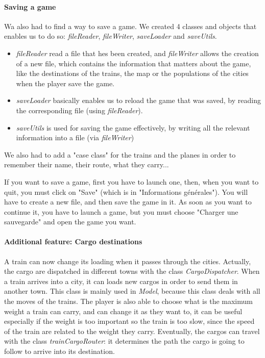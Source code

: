 \documentclass[a4paper]{article}
\begin{document}
	\paragraph{Saving a game} 
	Wa also had to find a way to save a game. We created 4 classes and objects that enables us to do so: \textit{fileReader}, \textit{fileWriter}, \textit{saveLoader} and \textit{saveUtils}.
	\begin{itemize}
		\item \textit{fileReader} read a file that hes been created, and \textit{fileWriter} allows the creation of a new file, which contains the information that matters about the game, like the destinations of the trains, the map or the populations of the cities when the player save the game.
		\item \textit{saveLoader} basically enables us to reload the game that was saved, by reading the corresponding file (using \textit{fileReader}).
		\item  \textit{saveUtils} is used for saving the game effectively, by writing all the relevant information into a file (via \textit{fileWriter})
	\end{itemize}
	We also had to add a "case class" for the trains and the planes in order to remember their name, their route, what they carry...
	
	If you want to save a game, first you have to launch one, then, when you want to quit, you must click on "Save" (which is in "Informations générales"). You will have to create a new file, and then save the game in it.
	As soon as you want to continue it, you have to launch a game, but you must choose "Charger une sauvegarde" and open the game you want.

	\paragraph{Additional feature: Cargo destinations}
	A train can now change its loading when it passes through the cities. Actually, the cargo are dispatched in different towns with the class \textit{CargoDispatcher}. When a train arrives into a city, it can loads new cargos in order to send them in another town. This class is mainly used in \textit{Model}, because this class deals with all the moves of the trains. The player is also able to choose what is the maximum weight a train can carry, and can change it as they want to, it can be useful especially if the weight is too important so the train is too slow, since the speed of the train are related to the weight they carry. Eventually, the cargos can travel with the class \textit{trainCargoRouter}: it determines the path the cargo is going to follow to arrive into its destination.
	
\end{document}
